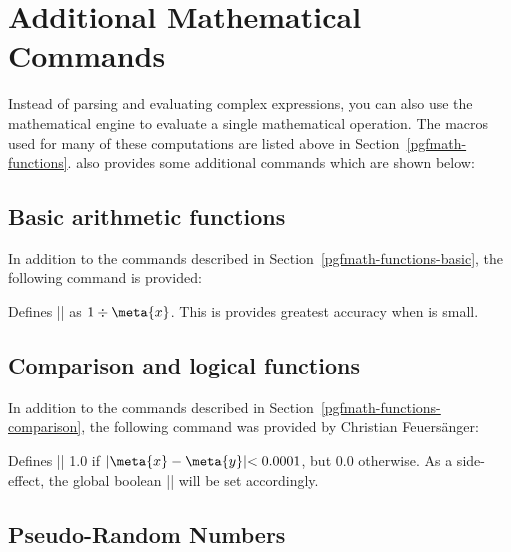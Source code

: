 %
%
%

\section{Additional Mathematical Commands}

\label{pgfmath-commands}

Instead of parsing and evaluating complex expressions, you can also
use the mathematical engine to evaluate a single mathematical
operation. The macros used for many of these computations are listed 
above in Section~\ref{pgfmath-functions}. \pgfname{} also provides 
some additional commands which are shown below:

\subsection{Basic arithmetic functions}

\label{pgfmath-commands-basic}

In addition to the commands described in 
Section~\ref{pgfmath-functions-basic}, the following command is
provided:

\begin{command}{\pgfmathreciprocal{}}         
	Defines |\pgfmathresult| as $1\div\meta{x}$. This is provides 
	greatest accuracy when  is small.                  
\end{command}

\subsection{Comparison and logical functions}

In addition to the commands described in 
Section~\ref{pgfmath-functions-comparison}, 
the following command was provided by Christian Feuers\"anger:

\begin{command}{\pgfmathapproxequalto{}}       
	Defines |\pgfmathresult| 1.0 if $ \rvert \meta{x} - \meta{y} \lvert < 0.0001$, but 0.0 otherwise.                    
	As a side-effect, the global boolean |\ifpgfmathcomparison| will be set accordingly.
\end{command}

\subsection{Pseudo-Random Numbers}


